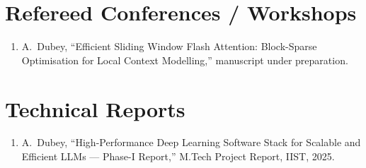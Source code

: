 \vspace{-1cm}
\section*{Refereed Conferences / Workshops}
\begin{enumerate}
    \item A.~Dubey, ``Efficient Sliding Window Flash Attention:
          Block-Sparse Optimisation for Local Context Modelling,''
          manuscript under preparation.
\end{enumerate}

\section*{Technical Reports}
\begin{enumerate}
    \item A.~Dubey, ``High-Performance Deep Learning Software Stack for
          Scalable and Efficient LLMs --- Phase-I Report,'' M.Tech Project
          Report, IIST, 2025.
\end{enumerate}
